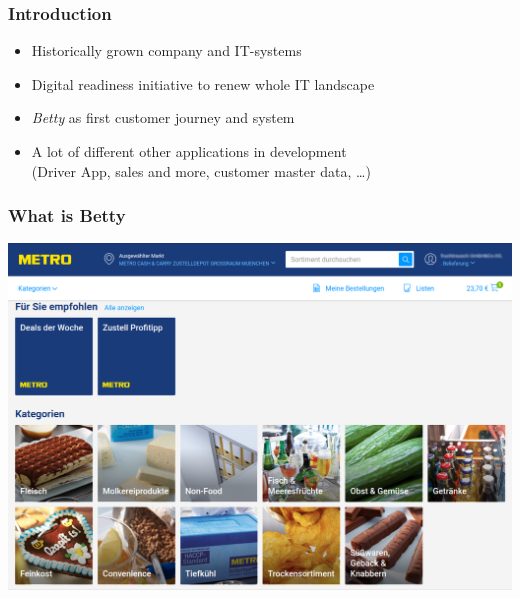 \documentclass{beamer}
\begin{document}
\begin{frame}\frametitle{Introduction}
\centering
\begin{itemize}
\item Historically grown company and IT-systems
\item Digital readiness initiative to renew whole IT landscape
\item \textit{Betty} as first customer journey and system
\item A lot of different other applications in development\\
(Driver App, sales and more, customer master data, …)
\end{itemize}
\end{frame}

\begin{frame}\frametitle{What is Betty}
\centering
\begin{center}
\includegraphics[width=.85\linewidth,height=.85\textheight,keepaspectratio]{Betty.png}
\end{center}
\end{frame}
\end{document}
